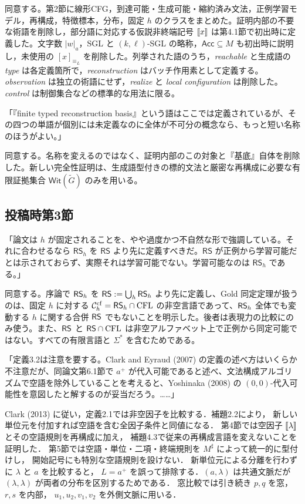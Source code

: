 \Reply
同意する。第2節に線形CFG，到達可能・生成可能・縮約済み文法，正例学習モデル，再構成，特徴標本，分布，固定 $h$ のクラスをまとめた。証明内部の不要な術語を削除し，部分語に対応する仮説非終端記号 $\llbracket x\rrbracket$ は第4.1節で初出時に定義した。文字数 $|w|_a$，SGL と $(k,\ell)$-SGL の略称，$\mathsf{Acc}\subseteq M$ も初出時に説明し，未使用の $[x]_{\equiv_L}$ を削除した。列挙された語のうち，\emph{reachable} と生成語の \emph{type} は各定義箇所で，\emph{reconstruction} はバッチ作用素として定義する。\emph{observation} は独立の術語にせず，\emph{realize} と \emph{local configuration} は削除した。\emph{control} は制御集合などの標準的な用法に限る。

「『finite typed reconstruction basis』という語はここでは定義されているが、その四つの単語が個別には未定義なのに全体が不可分の概念なら、もっと短い名称のほうがよい。」

\Reply
同意する。名称を変えるのではなく、証明内部のこの対象と『基底』自体を削除した。新しい完全性証明は、生成語型付きの標的文法と厳密な再構成に必要な有限証拠集合 $\mathsf{Wit}(\widetilde G)$ のみを用いる。

\subsection*{投稿時第3節}
「論文は $h$ が固定されることを、やや過度かつ不自然な形で強調している。それに合わせるなら $\mathsf{RS}_h$ を $\mathsf{RS}$ より先に定義すべきだ。$\mathsf{RS}$ が正例から学習可能だとは示されておらず、実際それは学習可能でない。学習可能なのは $\mathsf{RS}_h$ である。」

\Reply
同意する。序論で $\mathsf{RS}_h$ を $\mathsf{RS}:=\bigcup_h\mathsf{RS}_h$ より先に定義し、Gold 同定定理が扱うのは、固定 $h$ に対する $\mathcal C_h^{\mathrm{cf}}=\mathsf{RS}_h\cap\mathrm{CFL}$ の非空言語であって、$\mathsf{RS}_h$ 全体でも変動する $h$ に関する合併 $\mathsf{RS}$ でもないことを明示した。後者は表現力の比較にのみ使う。また、$\mathsf{RS}$ と $\mathsf{RS}\cap\mathrm{CFL}$ は非空アルファベット上で正例から同定可能ではない。すべての有限言語と $\Sigma^*$ を含むためである。

「定義3.2は注意を要する。Clark and Eyraud (2007) の定義の述べ方はいくらか不注意だが、同論文第6.1節で $a^+$ が代入可能であると述べ、文法構成アルゴリズムで空語を除外していることを考えると、Yoshinaka (2008) の $(0,0)$-代入可能性を意図したと解するのが妥当だろう。……」

\Reply
Clark (2013) に従い，定義2.1では非空因子を比較する．補題2.2により，
新しい単位元を付加すれば空語を含む全因子条件と同値になる．
第4節では空因子 $\llbracket \lambda\rrbracket$ とその空語規則を再構成に加え，
補題4.3で従来の再構成言語を変えないことを証明した．
第5節では空語・単位・二項・終端規則を $M^\sharp$ によって統一的に型付けし，
開始記号にも特別な空語規則を設けない．
新単位元による分離を行わずに $\lambda$ と $a$ を比較すると，
$L=a^+$ を誤って排除する．$(a,\lambda)$ は共通文脈だが
$(\lambda,\lambda)$ が両者の分布を区別するためである．
窓比較では引き続き $p,q$ を窓，$r,s$ を内部，
$u_1,u_2,v_1,v_2$ を外側文脈に用いる．

